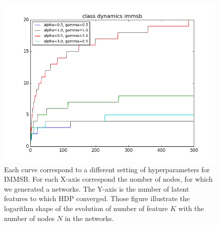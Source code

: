 \begin{figure}[h]
	\centering
	
	\includegraphics[scale=0.4]{img/class_dynamics}

	\caption{Each curve correspond to a different setting of hyperparameters for IMMSB. For each X-axis correspond the nomber of nodes, for which we generated a networks. The Y-axis is the number of latent features to which HDP converged. Those figure illustrate the logarithm shape of the evolution of number of feature $K$ with the number of nodes $N$ in the networks.}
	\label{fig:gen_dyn}
\end{figure}

